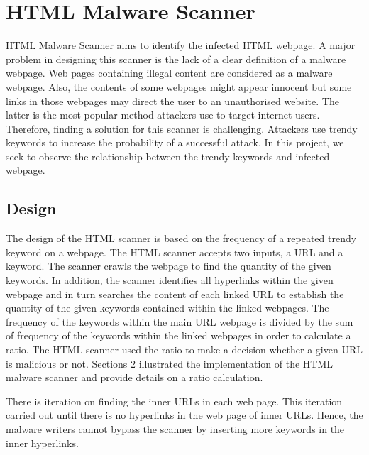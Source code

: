 \section{HTML Malware Scanner}

HTML Malware Scanner aims to identify the infected HTML webpage. A major problem in designing this scanner is the lack of a clear definition of a malware webpage. Web pages containing illegal content are considered as a malware webpage. Also, the contents of some webpages might appear innocent but some links in those webpages may direct the user to an unauthorised website. The latter is the most popular method attackers use to target internet users. Therefore, finding a solution for this scanner is challenging. Attackers use trendy keywords to increase the probability of a successful attack. In this project, we seek to observe the relationship between the trendy keywords and infected webpage.

\subsection{Design}

The design of the HTML scanner is based on the frequency of a repeated trendy keyword on a webpage. The HTML scanner accepts two inputs, a URL and a keyword. The scanner crawls the webpage to find the quantity of the given keywords. In addition, the scanner identifies all hyperlinks within the given webpage and in turn searches the content of each linked URL to establish the quantity of the given keywords contained within the linked webpages. The frequency of the keywords within the main URL webpage is divided by the sum of frequency of the keywords within the linked webpages in order to calculate a ratio. The HTML scanner used the ratio to make a decision whether a given URL is malicious or not. Sections 2 illustrated the implementation of the HTML malware scanner and provide details on a ratio calculation.

There is iteration on finding the inner URLs in each web page. This iteration carried out until there is no hyperlinks in the web page of inner URLs. Hence, the malware writers cannot bypass the scanner by inserting more keywords in the inner hyperlinks. 
